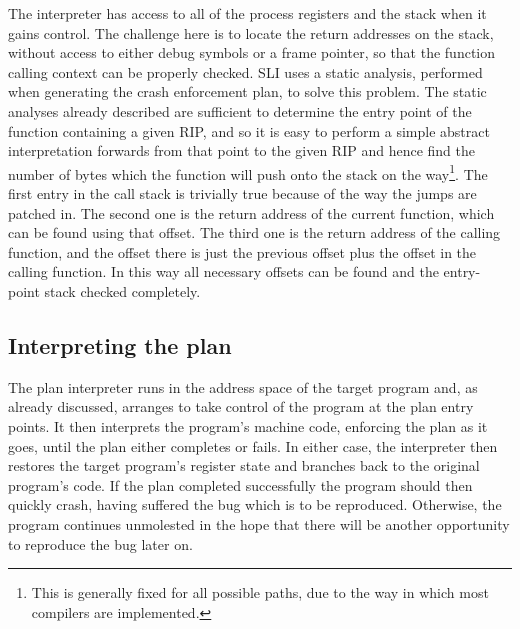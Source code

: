 The interpreter has access to all of the process registers and the
stack when it gains control.  The challenge here is to locate the
return addresses on the stack, without access to either debug symbols
or a frame pointer, so that the function calling context can be
properly checked.  SLI uses a static analysis, performed when
generating the crash enforcement plan, to solve this problem.  The
static analyses already described are sufficient to determine the
entry point of the function containing a given RIP, and so it is easy
to perform a simple abstract interpretation forwards from that point
to the given RIP and hence find the number of bytes which the function
will push onto the stack on the way\footnote{This is generally fixed
  for all possible paths, due to the way in which most compilers are
  implemented.}.  The first entry in the call stack is trivially true
because of the way the jumps are patched in.  The second one is the
return address of the current function, which can be found using that
offset.  The third one is the return address of the calling function,
and the offset there is just the previous offset plus the offset in
the calling function.  In this way all necessary offsets can be found
and the entry-point stack checked completely.


\subsection{Interpreting the plan}
\label{sect:enforce:interpreting}


The plan interpreter runs in the address space of the target program
and, as already discussed, arranges to take control of the program at
the plan entry points.  It then interprets the program's machine code,
enforcing the plan as it goes, until the plan either completes or
fails.  In either case, the interpreter then restores the target
program's register state and branches back to the original program's
code.  If the plan completed successfully the program should then
quickly crash, having suffered the bug which is to be reproduced.
Otherwise, the program continues unmolested in the hope that there
will be another opportunity to reproduce the bug later on.


